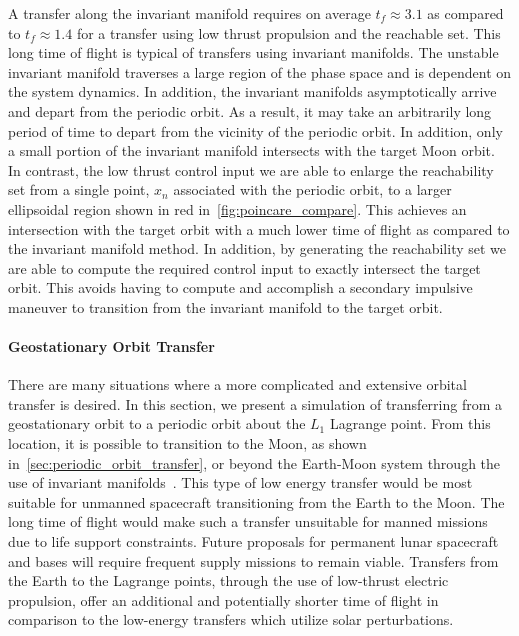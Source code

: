 A transfer along the invariant manifold requires on average \( t_f \approx 3.1 \) as compared to \( t_f \approx 1.4 \) for a transfer using low thrust propulsion and the reachable set.
This long time of flight is typical of transfers using invariant manifolds.
The unstable invariant manifold traverses a large region of the phase space and is dependent on the system dynamics. 
In addition, the invariant manifolds asymptotically arrive and depart from the periodic orbit. 
As a result, it may take an arbitrarily long period of time to depart from the vicinity of the periodic orbit.
In addition, only a small portion of the invariant manifold intersects with the target Moon orbit.
In contrast, the low thrust control input we are able to enlarge the reachability set from a single point, \( x_n\) associated with the periodic orbit, to a larger ellipsoidal region shown in red in~\cref{fig:poincare_compare}.
This achieves an intersection with the target orbit with a much lower time of flight as compared to the invariant manifold method.
In addition, by generating the reachability set we are able to compute the required control input to exactly intersect the target orbit.
This avoids having to compute and accomplish a secondary impulsive maneuver to transition from the invariant manifold to the target orbit.

\paragraph{Geostationary Orbit Transfer}
There are many situations where a more complicated and extensive orbital transfer is desired. 
In this section, we present a simulation of transferring from a geostationary orbit to a periodic orbit about the \( L_1 \) Lagrange point.
From this location, it is possible to transition to the Moon, as shown in~\cref{sec:periodic_orbit_transfer}, or beyond the Earth-Moon system through the use of invariant manifolds~\cite{koon2011}.
This type of low energy transfer would be most suitable for unmanned spacecraft transitioning from the Earth to the Moon.
The long time of flight would make such a transfer unsuitable for manned missions due to life support constraints.
Future proposals for permanent lunar spacecraft and bases will require frequent supply missions to remain viable. 
Transfers from the Earth to the Lagrange points, through the use of low-thrust electric propulsion, offer an additional and potentially shorter time of flight in comparison to the low-energy transfers which utilize solar perturbations.

